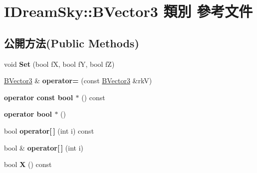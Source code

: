 \hypertarget{class_i_dream_sky_1_1_b_vector3}{}\section{I\+Dream\+Sky\+:\+:B\+Vector3 類別 參考文件}
\label{class_i_dream_sky_1_1_b_vector3}
\subsection*{公開方法(Public Methods)}
\begin{DoxyCompactItemize}
\item 
void {\bfseries Set} (bool fX, bool fY, bool fZ)\hypertarget{class_i_dream_sky_1_1_b_vector3_af2180b4277d09392f29c1d724f2630a5}{}\label{class_i_dream_sky_1_1_b_vector3_af2180b4277d09392f29c1d724f2630a5}

\item 
\hyperlink{class_i_dream_sky_1_1_b_vector3}{B\+Vector3} \& {\bfseries operator=} (const \hyperlink{class_i_dream_sky_1_1_b_vector3}{B\+Vector3} \&rkV)\hypertarget{class_i_dream_sky_1_1_b_vector3_ad79474f59b0b47b2a20a3061ae70a503}{}\label{class_i_dream_sky_1_1_b_vector3_ad79474f59b0b47b2a20a3061ae70a503}

\item 
{\bfseries operator const bool $\ast$} () const \hypertarget{class_i_dream_sky_1_1_b_vector3_a09ede2864f5184680a8f392ca562741c}{}\label{class_i_dream_sky_1_1_b_vector3_a09ede2864f5184680a8f392ca562741c}

\item 
{\bfseries operator bool $\ast$} ()\hypertarget{class_i_dream_sky_1_1_b_vector3_a7d1efd8de78bf44807b64a5174cb3775}{}\label{class_i_dream_sky_1_1_b_vector3_a7d1efd8de78bf44807b64a5174cb3775}

\item 
bool {\bfseries operator\mbox{[}$\,$\mbox{]}} (int i) const \hypertarget{class_i_dream_sky_1_1_b_vector3_abfd147c6c879af57362e1b1602658ac9}{}\label{class_i_dream_sky_1_1_b_vector3_abfd147c6c879af57362e1b1602658ac9}

\item 
bool \& {\bfseries operator\mbox{[}$\,$\mbox{]}} (int i)\hypertarget{class_i_dream_sky_1_1_b_vector3_ab91dd0727a8bff43b3c27fd6d07ac2ea}{}\label{class_i_dream_sky_1_1_b_vector3_ab91dd0727a8bff43b3c27fd6d07ac2ea}

\item 
bool {\bfseries X} () const \hypertarget{class_i_dream_sky_1_1_b_vector3_a2c63a0f0c612101be1c300c1aec0fb61}{}\label{class_i_dream_sky_1_1_b_vector3_a2c63a0f0c612101be1c300c1aec0fb61}


\end{DoxyCompactItemize}
